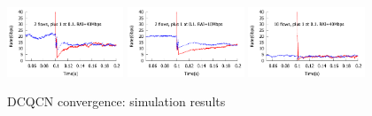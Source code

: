 \begin{figure}[t]
\center
\subfigure
{
\includegraphics[width=0.31\textwidth]{figures/dcqcn_converge_3.pdf}
\label{fig:dcqcn_convergence_sim_3}
}
\subfigure
{
\includegraphics[width=0.31\textwidth]{figures/dcqcn_converge_3rai.pdf}
\label{fig:dcqcn_convergence_sim_3rai}
}
\subfigure
{
\includegraphics[width=0.31\textwidth]{figures/dcqcn_converge_11.pdf}
\label{fig:dcqcn_convergence_sim_11}
}
\vspace{-1em}
\caption{DCQCN convergence: simulation results}
\vspace{-1em}
\label{fig:dcqcn_convergence_sim}
\end{figure}
\fi

\vspace{-0.2cm}

